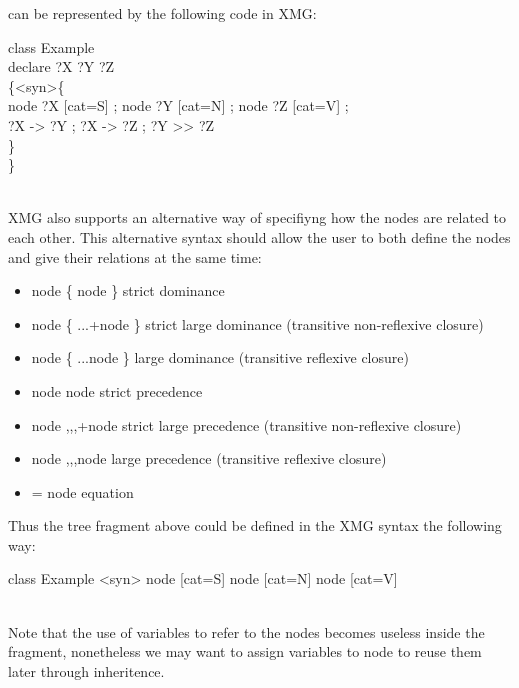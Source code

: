 \documentclass[11pt,fleqn]{book} %
\begin{document}
\begin{center}
\end{center}
can be represented by the following code in XMG:
\\
\begin{theorem}
class Example\\
declare ?X ?Y ?Z\\
\{<syn>\{\\
      node ?X [cat=S] ; node ?Y [cat=N] ; node ?Z [cat=V] ;\\
      ?X -> ?Y ; ?X -> ?Z ; ?Y >> ?Z\\
      \}\\
\}
\end{theorem}
\\
XMG also supports an alternative way of specifiyng how the nodes are related to each other. This alternative syntax should allow the user to both define the nodes and give their relations at the same time:

\begin{itemize}
\item node \{ node \} 	strict dominance
\item node \{ ...+node \} 	strict large dominance (transitive non-reflexive closure)
\item node \{ ...node \} 	large dominance (transitive reflexive closure)
\item node node 	strict precedence
\item node ,,,+node 	strict large precedence (transitive non-reflexive closure)
\item node ,,,node 	large precedence (transitive reflexive closure)
\item = 	node equation
\end{itemize}
Thus the tree fragment above could be defined in the XMG syntax the following way:
\\
\begin{theorem}
class Example
{<syn>{
       node [cat=S] {
               node [cat=N]
               node [cat=V]
               }
       }
}
\end{theorem}
\\
Note that the use of variables to refer to the nodes becomes useless inside the fragment, nonetheless we may want to assign variables to node to reuse them later through inheritence. 
\end{document}
